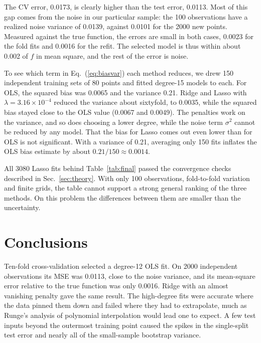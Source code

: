 \documentclass[aps,prb,reprint,superscriptaddress,nofootinbib,longbibliography,floatfix]{revtex4-2}
\begin{document}
The CV error, 0.0173, is clearly higher than the test error, 0.0113. Most of this gap comes from the noise in our particular sample: the 100 observations have a realized noise variance of 0.0139, against 0.0101 for the 2000 new points. Measured against the true function, the errors are small in both cases, 0.0023 for the fold fits and 0.0016 for the refit. The selected model is thus within about 0.002 of $f$ in mean square, and the rest of the error is noise.

To see which term in Eq.~(\ref{eq:biasvar}) each method reduces, we drew 150 independent training sets of 80 points and fitted degree-15 models to each. For OLS, the squared bias was 0.0065 and the variance 0.21. Ridge and Lasso with $\lambda=3.16\times10^{-4}$ reduced the variance about sixtyfold, to 0.0035, while the squared bias stayed close to the OLS value (0.0067 and 0.0049). The penalties work on the variance, and so does choosing a lower degree, while the noise term $\sigma^2$ cannot be reduced by any model. That the bias for Lasso comes out even lower than for OLS is not significant. With a variance of 0.21, averaging only 150 fits inflates the OLS bias estimate by about $0.21/150\approx0.0014$.

All 3080 Lasso fits behind Table~\ref{tab:final} passed the convergence checks described in Sec.~\ref{sec:theory}. With only 100 observations, fold-to-fold variation and finite grids, the table cannot support a strong general ranking of the three methods. On this problem the differences between them are smaller than the uncertainty.

\clearpage
\section{Conclusions}\label{sec:conclusion}
Ten-fold cross-validation selected a degree-12 OLS fit. On 2000 independent observations its MSE was 0.0113, close to the noise variance, and its mean-square error relative to the true function was only 0.0016. Ridge with an almost vanishing penalty gave the same result. The high-degree fits were accurate where the data pinned them down and failed where they had to extrapolate, much as Runge's analysis of polynomial interpolation would lead one to expect. A few test inputs beyond the outermost training point caused the spikes in the single-split test error and nearly all of the small-sample bootstrap variance.
\end{document}
